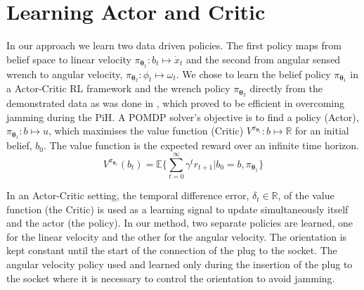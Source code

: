 \documentclass[final,3p,times,twocolumn]{elsarticle}
\newcommand{\Param}{\boldsymbol{\theta}}
\begin{document}


\section{Learning Actor and Critic}\label{ch4:learning-value-actor}

In our approach we learn two data driven policies. The first policy maps from belief space 
to linear velocity $\pi_{\Param_1} : b_t \mapsto \dot{x}_t$ and the second from 
angular sensed wrench to angular velocity, $ \pi_{\Param_2} : \phi_t \mapsto \omega_t$.
We chose to learn the belief policy $\pi_{\Param_1}$ in a Actor-Critic RL framework 
and the wrench policy $\pi_{\Param_2}$ directly from the demonstrated data as was done 
in \cite[Chap. 5]{Kronander2015}, which proved to be efficient in overcoming jamming during the PiH. 
A POMDP solver's objective is to find a policy (Actor), $\pi_{\Param_1}: b \mapsto u$, which maximises 
the value function (Critic) $V^{\pi_{\Param_1}} : b \mapsto \mathbb{R}$ for an initial belief, $b_{0}$. The value function
is the expected reward over an infinite time horizon.
\begin{equation}\label{eq:value_function}
  V^{\pi_{\Param_1}}(b_t) = \mathbb{E}\Bigg\{ \sum_{t=0}^{\infty} \gamma^{t} r_{t+1} | b_0=b,\pi_{\Param_1}\Bigg\}
\end{equation}

In an Actor-Critic setting, the temporal difference error, $\delta_t \in \mathbb{R}$, of the value function (the Critic) is 
used as a learning signal to update simultaneously itself and the actor (the policy). In our method, 
two separate policies are learned, one for the linear velocity and the other for the angular velocity.
The orientation is kept constant until the start of the connection of the plug to the socket.
The angular velocity policy used and learned only during the insertion of the plug to the socket where it is necessary
to control the orientation to avoid jamming.
\end{document}

